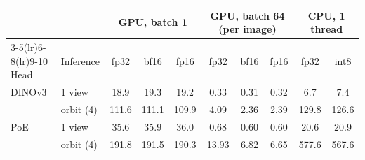 \begin{tabular}{@{}ll ccc ccc cc@{}}
\toprule
 & & \multicolumn{3}{c}{GPU, batch 1} & \multicolumn{3}{c}{GPU, batch 64 (per image)} & \multicolumn{2}{c}{CPU, 1 thread} \\
\cmidrule(lr){3-5}\cmidrule(lr){6-8}\cmidrule(lr){9-10}
Head & Inference & fp32 & bf16 & fp16 & fp32 & bf16 & fp16 & fp32 & int8 \\
\midrule
DINOv3 & 1 view & 18.9 & 19.3 & 19.2 & 0.33 & 0.31 & 0.32 & 6.7 & 7.4 \\
 & orbit (4) & 111.6 & 111.1 & 109.9 & 4.09 & 2.36 & 2.39 & 129.8 & 126.6 \\
PoE & 1 view & 35.6 & 35.9 & 36.0 & 0.68 & 0.60 & 0.60 & 20.6 & 20.9 \\
 & orbit (4) & 191.8 & 191.5 & 190.3 & 13.93 & 6.82 & 6.65 & 577.6 & 567.6 \\
\bottomrule
\end{tabular}